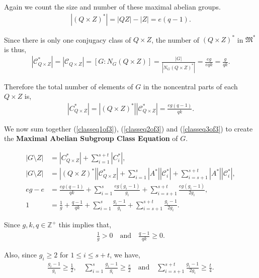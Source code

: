 Again we count the size and number of these maximal abelian groups.
\begin{align*} |(Q \times Z)^*| = |QZ| - |Z| = e(q-1).
\end{align*}

Since there is only one conjugacy class of $Q \times Z$, the number of $(Q \times Z)^*$ in $\mathfrak{M}^*$ is thus,
\begin{align*} 
  |\mathcal{C}_{Q \times Z}^*| =  |\mathcal{C}_{Q \times Z}| =  [G: N_G(Q \times Z)] = \frac{|G|}{|N_G(Q \times Z)^*|} = \frac{eg}{eqk} = \frac{g}{qk}.
\end{align*}

Therefore the total number of elements of $G$ in the noncentral parts of each $Q \times Z$ is,
\begin{align} \label{classeq3of3} 
  |C_{Q \times Z}^*| = |(Q \times Z)^*| |\mathcal{C}_{Q \times Z}^*| = \frac{eg(q-1)}{qk}.
\end{align}

We now sum together (\ref{classeq1of3}), (\ref{classeq2of3}) and (\ref{classeq3of3}) to create the \textbf{Maximal Abelian Subgroup Class Equation} of $G$.

\begin{align}\label{classeq} |G \! \setminus \! Z| &= |C_{Q \times Z}^*| + \sum_{i=1}^{s+t} |C_i^*|, \nonumber \\
|G \! \setminus \! Z| &= |(Q \times Z)^*| |\mathcal{C}_{Q \times Z}^*| + \sum_{i=1}^{s} |A^*| |\mathcal{C}_i^*| + \sum_{i=s+1}^{s+t} |A^*| |\mathcal{C}_i^*|, \nonumber \\
eg - e &= \frac{eg(q-1)}{qk} + \sum_{i=1}^{s} \frac{eg(g_i-1)}{g_i} + \sum_{i=s+1}^{s+t} \frac{eg(g_i-1)}{2g_i}, \nonumber \\
1 &= \frac{1}{g} + \frac{q-1}{qk} + \sum_{i=1}^{s} \frac{g_i-1}{g_i} + \sum_{i=s+1}^{s+t} \frac{g_i-1}{2g_i}.
\end{align}

Since $g,k,q \in \mathbb{Z}^+$ this implies that,
\begin{align*} \frac{1}{g} > 0 \quad \text{and} \quad \frac{q-1}{qk} \geq 0.
\end{align*} 

Also, since $g_i \geq 2$ for $1 \leq i \leq s + t$, we have,
\begin{align*} 
  \frac{g_i-1}{g_i} \geq \frac{1}{2}, \quad \sum_{i=1}^{s} \frac{g_i-1}{g_i} \geq \frac{s}{2} \quad \text{and} \quad \sum_{i=s+1}^{s+t} \frac{g_i-1}{2g_i} \geq \frac{t}{4}.
\end{align*}

